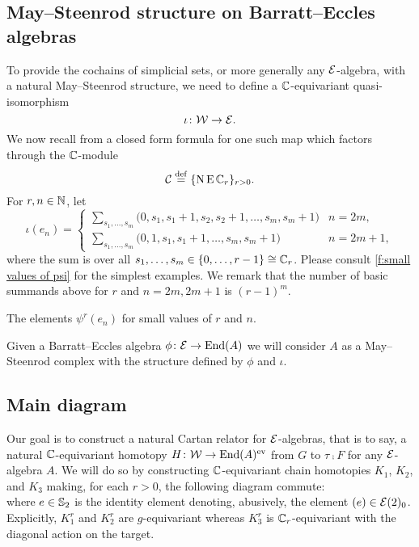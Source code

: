 \subsection{May--Steenrod structure on Barratt--Eccles algebras}\label{ss:may-steenrod on barratt-eccles}

To provide the cochains of simplicial sets, or more generally any $\mathcal{E}$-algebra, with a natural May--Steenrod structure, we need to define a $\mathbb{C}$-equivariant quasi-isomorphism
\[
\iota \colon \mathcal{W} \to \mathcal{E}.
\]
We now recall from \cite{medina2021may_st} a closed form formula for one such map which factors through the $\mathbb{C}$-module
\[
\mathcal{C} \stackrel{\mathrm{def}}{=} \{\operatorname{N}\operatorname{E}\mathbb{C}_r\}_{r>0}.
\]
For $r,n\in\mathbb{N}$, let
\[
	\iota(e_{n}) =
	\begin{cases}
		\displaystyle{\sum_{s_1, \dots, s_m}} \big(0, {s_1}, {s_1+1}, {s_2}, {s_2+1}, \dots, {s_{m}}, {s_{m}+1} \big) & n = 2m, \\
		\displaystyle{\sum_{s_1, \dots, s_m}} \big(0, 1, {s_1}, {s_1+1}, \dots, {s_{m}}, {s_{m}+1} \big) & n = 2m+1,
	\end{cases}
\]
where the sum is over all $s_1, \dots, s_m \in \{0, \dots, r-1\} \cong \mathbb{C}_r$.
Please consult \cref{f:small values of psi} for the simplest examples.
We remark that the number of basic summands above for $r$ and $n = 2m, 2m + 1$ is $(r-1)^m$.

\begin{table}
	\centering
	
	\caption{The elements $\psi^r(e_n)$ for small values of $r$ and $n$.}
	\label{f:small values of psi}
\end{table}

Given a Barratt--Eccles algebra $\phi \colon \mathcal{E} \to \mathrm{End}(A)$ we will consider $A$ as a May--Steenrod complex with the structure defined by $\phi$ and $\iota$.

\subsection{Main diagram}

Our goal is to construct a natural Cartan relator for $\mathcal{E}$-algebras, that is to say, a natural $\mathbb{C}$-equivariant homotopy $H \colon \mathcal{W} \to \mathrm{End}(A)^{\mathrm{ev}}$ from $G$ to $\tau \comp F$ for any $\mathcal{E}$-algebra $A$.
We will do so by constructing $\mathbb{C}$-equivariant chain homotopies $K_1$, $K_2$, and $K_3$ making, for each $r>0$, the following diagram commute:
\begin{equation}\label{d:big diagram}
	
\end{equation}
where $e \in \mathbb{S}_2$ is the identity element denoting, abusively, the element $(e) \in \mathcal{E}(2)_0$.
Explicitly, $K_1^r$ and $K_2^r$ are $g$-equivariant whereas $K_3^r$ is $\mathbb{C}_r$-equivariant with the diagonal action on the target.

